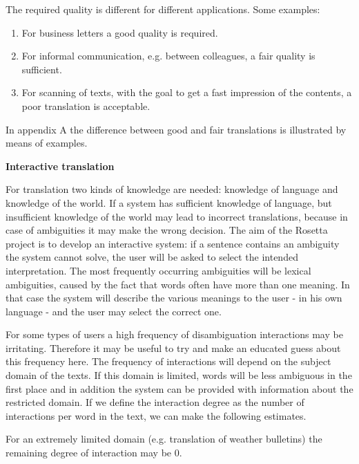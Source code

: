 The required quality is different for different applications. Some examples:

\begin{enumerate}

\item For business letters a good quality is required.

\item For informal communication, e.g. between colleagues, a fair quality is 
sufficient.

\item For scanning of texts, with the goal to get a fast impression of the 
contents, a poor translation is acceptable. 

\end{enumerate} 

In appendix A the difference between good and fair translations
is illustrated by means of examples.

\bigskip

{\bf Interactive translation}

For translation two kinds of knowledge are needed:
knowledge of language and knowledge of the world. If a system has sufficient 
knowledge of language, but insufficient knowledge of the world may lead to 
incorrect translations, because in case of ambiguities it may make the wrong 
decision.
The aim of the Rosetta project is to develop an interactive system: if a 
sentence contains an ambiguity the system cannot solve, the user will be asked 
to select the intended interpretation. The most frequently occurring 
ambiguities will be lexical ambiguities, caused by the fact that words often 
have more than one meaning.
In that case the system will describe the various meanings to the user - in his 
own language - and the user may select the correct one. 

For some types of users a high frequency of disambiguation interactions may be 
irritating. Therefore it may be useful to try and make an educated guess about 
this frequency here.
The frequency of interactions will depend on the subject domain of the texts.
If this domain is limited, words will be less ambiguous in the first place and 
in addition the system can be provided with information about the restricted 
domain. 
If we define 
the interaction degree as the number of interactions per word 
in the text,
we can make the following estimates. 

For an extremely limited domain (e.g. translation of weather 
bulletins) the remaining degree of interaction may be 0.

